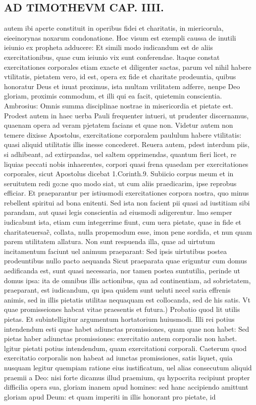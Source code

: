 \documentclass{article}
\begin{document}
\begin{pages}
\section*{AD TIMOTHEVM CAP. IIII. }
\marginpar{[ p.97 ]}\pstart autem ibi aperte constituit in operibus fidei et charitatis, in miericorula, eieeinorynas noxarum condonatione. Hoc visum est exempli caussa de inutili ieiunio ex propheta adducere: Et simili modo iudicandum est de aliis exercitationibus, quae cum ieiunio vix sunt conferendae. ltaque constat exercitationes corporales etiam exacte et diligenter sactas, parum vel nihil habere vtilitatis, pietatem vero, id est, opera ex fide et charitate prodeuntia, quibus honoratur Deus et iuuat proximus, ista multam vrilitatem adferre, nenpe Deo gloriam, proximis commodum, et illi qui ea facit, quietemin conscientia. Ambrosius: Omnis summa disciplinae nostrae in misericordia et pietate est. Prodest autem in haec uerba Pauli frequenter intueri, ut prudenter discernamus, quaenam opera ad veram pjetatem facians et quae non. Videtur autem non temere dixisse Apostolus, exercitatione corporalem paululum habere vtilitatis: quasi aliquid utilitatis illis inesse concederet. Reuera autem, pdest interdum piis, si adhibeant, ad extirpandas, uel saltem opprimendas, quantum fieri licet, re liquias peccati nobis inhaerentes, corpori quasi frena quaedam per exercitationes corporales, sicut Apostolus dicebat 1.Corinth.9. Subiicio corpus meum et in seruitutem redi go:ne quo modo siat, ut cum aliis praedicarim, ipse reprobus efficiar. Et praeparantur per istiusmodi exercitationes corpora nostra, quo minus rebellent spiritui ad bona enitenti. Sed ista non facient pii quasi ad iustitiam sibi parandam, aut quasi legis conscientia ad eiusmodi adigerentur. lmo semper iudicabunt ista, etiam cum integerrime fiunt, cum uera pietate, quae in fide et charitateuersac̃, collata, nulla propemodum esse, imon pene sordida, et nun quam parem utilitatem allatura. Non sunt respuenda illa, quae ad uirtutum incitamentum faciunt uel animum praeparant: Sed ipsis uirtutibus postea prodeuntibus nullo pacto aequanda Sicut praeparata quae eriguntur cum domus aedificanda est, sunt quasi necessaria, nor tamen postea suntutilia, perinde ut domus ipsa: ita de omnibus illis actionibus, qua ad continentiam, ad sobrietatem, praeparant, est iudicandum, qu ipsa quidem sunt ueluti necel saria effrenis animis, sed in illis pietatis utilitas nequaquam est collocanda, sed de his satis.  \pend\pstart Vt quae promisseiones habcat vitae praesentis et futura.) Probatio quod lit utilis pietas. Et subintelligitur argumentum hortatorium huiusmodi. Illi rei potius intendendum esti quae habet adiunctas promissiones, quam quae non habet: Sed pietas haber adiunctas promissiones: exercitatio autem corporalis non habet. lgitur pietati potius intendendum, quam exercitationi corporali. Caeterum quod exercitatio corporalis non habeat ad iunctas promissiones, satis liquet, quia nusquam legitur quempiam ratione eius iustificatum, uel alias consecutum aliquid praemii a Deo: nisi forte dicamus illud praemium, qu hypocrita recipiunt propter difficilia opera sua, gloriam inanem apud homines: sed hanc accipiendo amittunt gloriam apud Deum: et quam imperiti in illis honorant pro pietate, id 
\end{pages}
\end{document}
